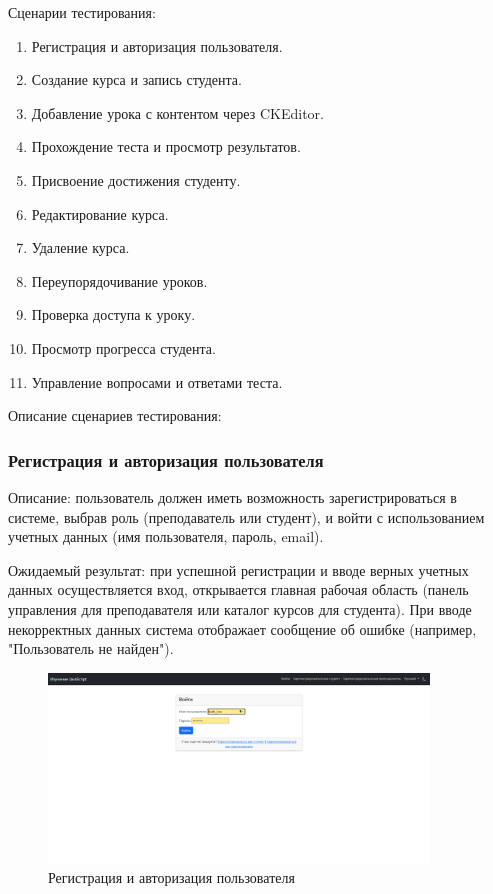 Сценарии тестирования:
	\begin{enumerate}
	\item Регистрация и авторизация пользователя.
	\item Создание курса и запись студента.
	\item Добавление урока с контентом через CKEditor.
	\item Прохождение теста и просмотр результатов.
	\item Присвоение достижения студенту.
	\item Редактирование курса.
	\item Удаление курса.
	\item Переупорядочивание уроков.
	\item Проверка доступа к уроку.
	\item Просмотр прогресса студента.
	\item Управление вопросами и ответами теста.
	\end{enumerate}


Описание сценариев тестирования:


	
\subsubsection{Регистрация и авторизация пользователя}
	
Описание: пользователь должен иметь возможность зарегистрироваться в системе, выбрав роль (преподаватель или студент), и войти с использованием учетных данных (имя пользователя, пароль, email).
	
Ожидаемый результат: при успешной регистрации и вводе верных учетных данных осуществляется вход, открывается главная рабочая область (панель управления для преподавателя или каталог курсов для студента). При вводе некорректных данных система отображает сообщение об ошибке (например, "Пользователь не найден").
	
	\begin{figure}[ht]
		\centering
		\includegraphics[width=0.9\textwidth]{images/регистр} 
		\caption{Регистрация и авторизация пользователя}
		\label{login:image}
	\end{figure}
	
